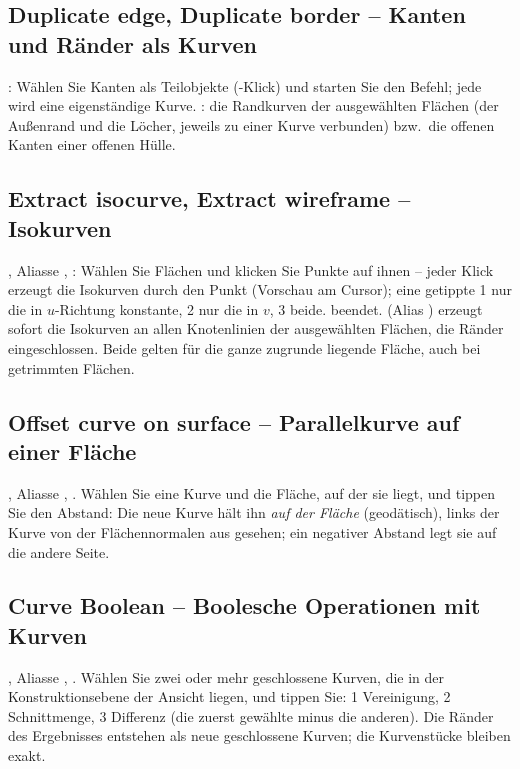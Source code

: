 \subsection{Duplicate edge, Duplicate border -- Kanten und Ränder als Kurven}\label{sec:cmd-dupedge}
: Wählen Sie Kanten als Teilobjekte (-Klick) und starten Sie den
Befehl; jede wird eine eigenständige Kurve. : die Randkurven der ausgewählten
Flächen (der Außenrand und die Löcher, jeweils zu einer Kurve verbunden) bzw.\ die offenen
Kanten einer offenen Hülle.

\subsection{Extract isocurve, Extract wireframe -- Isokurven}\label{sec:cmd-iso}
, Aliasse , : Wählen Sie Flächen und
klicken Sie Punkte auf ihnen -- jeder Klick erzeugt die Isokurven durch den Punkt (Vorschau am
Cursor); eine getippte 1 nur die in $u$-Richtung konstante, 2 nur die in $v$, 3 beide.
 beendet.  (Alias ) erzeugt sofort die
Isokurven an allen Knotenlinien der ausgewählten Flächen, die Ränder eingeschlossen. Beide
gelten für die ganze zugrunde liegende Fläche, auch bei getrimmten Flächen.

\subsection{Offset curve on surface -- Parallelkurve auf einer Fläche}\label{sec:cmd-offset-on-surface}
, Aliasse , . Wählen Sie eine
Kurve und die Fläche, auf der sie liegt, und tippen Sie den Abstand: Die neue Kurve hält ihn
\emph{auf der Fläche} (geodätisch), links der Kurve von der Flächennormalen aus gesehen; ein
negativer Abstand legt sie auf die andere Seite.

\subsection{Curve Boolean -- Boolesche Operationen mit Kurven}\label{sec:cmd-curve-boolean}
, Aliasse , . Wählen Sie zwei oder mehr
geschlossene Kurven, die in der Konstruktionsebene der Ansicht liegen, und tippen Sie: 1
Vereinigung, 2 Schnittmenge, 3 Differenz (die zuerst gewählte minus die anderen). Die Ränder des
Ergebnisses entstehen als neue geschlossene Kurven; die Kurvenstücke bleiben exakt.

